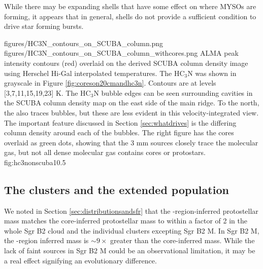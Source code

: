 \documentclass[twocolumn]{aastex61}
\begin{document}
% 



While there may be expanding shells that have some effect on where MYSOs are
forming, it appears that in general, shells do not provide a sufficient
condition to drive star forming bursts.


\FigureTwo
{figures/HC3N_contours_on_SCUBA_column.png}
{figures/HC3N_contours_on_SCUBA_column_withcores.png}
{ALMA \cyanoacetylene peak intensity contours (red) overlaid on the derived SCUBA
column density
image using Herschel Hi-Gal interpolated temperatures. The HC$_3$N was
shown in grayscale in Figure \ref{fig:coreson20cmandhc3n}.
Contours are at levels [3,7,11,15,19,23] K.  The  HC$_3$N bubble edges can be
seen surrounding cavities in the SCUBA column density map on the east side of
the main ridge.  To the north, the \cyanoacetylene also traces bubbles, but these are
less evident in this velocity-integrated view.  The important feature discussed
in Section \ref{sec:whatdrives} is the differing column density around each of
the bubbles.  The right figure has the cores overlaid as green dots,
showing that the 3 mm sources closely trace the molecular gas, but not all
dense molecular gas contains cores or protostars.}
{fig:hc3nonscuba}{1}{0.5\textwidth}

\subsection{The clusters and the extended population}
\label{sec:clustersandextended}
We noted in Section \ref{sec:distributionsandsfr} that the \hii-region-inferred
protostellar mass matches the core-inferred protostellar mass to within a
factor of 2 in the whole Sgr B2 cloud and the individual clusters excepting Sgr
B2 M.  In Sgr B2 M, the \hii-region inferred mass is $\sim9\times$ greater than
the core-inferred mass.  While the lack of faint sources in Sgr B2 M could
be an observational limitation, it may be a real effect signifying an evolutionary
difference.
\end{document}
